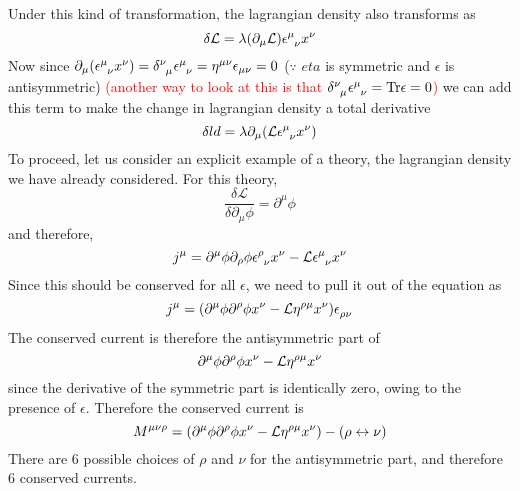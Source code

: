 \documentclass[11pt]{article}
\newcommand{\del}{\partial}
\newcommand{\ld}{\mathcal{L}}
\numberwithin{equation}{section}
\begin{document}
    Under this kind of transformation, the lagrangian density also transforms as 
    \begin{equation*}
        \delta \ld = \lambda (\del_\mu \ld) \epsilon\indices{^\mu_\nu} x^\nu 
    \end{equation*}
    Now since \(\del_\mu (\epsilon\indices{^\mu_\nu} x^\nu) = \delta\indices{^\nu_\mu}\epsilon\indices{^\mu_\nu} = \eta^{\mu\nu}\epsilon_{\mu\nu} = 0\) (\(\because\) \(eta\) is symmetric and \(\epsilon\) is antisymmetric) \textcolor{red}{(another way to look at this is that \(\delta\indices{^\nu_\mu}\epsilon\indices{^\mu_\nu} = \mathrm{Tr}\epsilon = 0\))} we can add this term to make the change in lagrangian density a total derivative 
    \begin{equation*}
        \delta ld = \lambda \del_\mu (\ld \epsilon\indices{^\mu_\nu} x^\nu)
    \end{equation*}
    To proceed, let us consider an explicit example of a theory, the lagrangian density we have already considered. For this theory, 
    \begin{equation*}
        \frac{\delta \ld}{\delta \del_\mu \phi} = \del^\mu \phi
    \end{equation*}
    and therefore, 
    \begin{equation*}
        j^\mu = \del^\mu \phi \del_\rho \phi \epsilon\indices{^\rho_\nu}x^\nu - \ld \epsilon\indices{^\mu_\nu} x^\nu
    \end{equation*}
    Since this should be conserved for all \(\epsilon\), we need to pull it out of the equation as 
    \begin{equation*}
        j^\mu = (\del^\mu \phi \del^\rho \phi x^\nu - \ld \eta\indices{^\rho^\mu} x^\nu)\epsilon\indices{_\rho_\nu}
    \end{equation*}
    The conserved current is therefore the antisymmetric part of 
    \begin{equation*}
        \del^\mu \phi \del^\rho \phi x^\nu - \ld \eta\indices{^\rho^\mu} x^\nu
    \end{equation*}
    since the derivative of the symmetric part is identically zero, owing to the presence of \(\epsilon\). Therefore the conserved current is 
    \begin{equation*}
        M^{\mu\nu\rho} = (\del^\mu \phi \del^\rho \phi x^\nu - \ld \eta\indices{^\rho^\mu} x^\nu) - (\rho\leftrightarrow \nu)
    \end{equation*}
    There are 6 possible choices of \(\rho\) and \(\nu\) for the antisymmetric part, and therefore 6 conserved currents. \\
\end{document}
